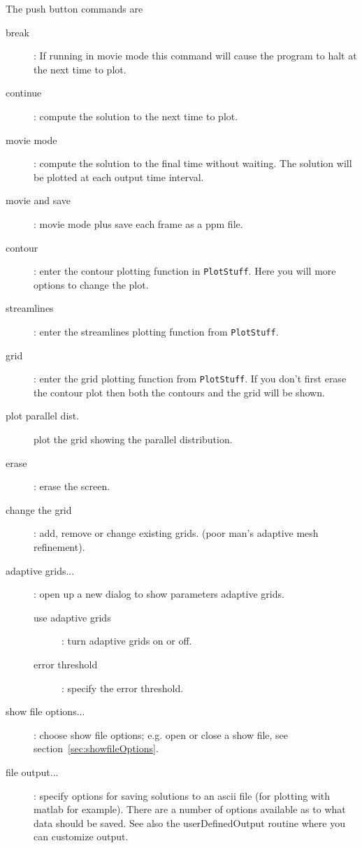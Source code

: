\noindent The push button commands are 
\begin{description}
  \item[\qquad break] : If running in movie mode this command will cause the program to halt at the next
                   time to plot.
  \item[\qquad continue] : compute the solution to the next time to plot.
  \item[\qquad movie mode] : compute the solution to the final time without waiting. The solution will be
       plotted at each output time interval. 
  \item[\qquad movie and save] : movie mode plus save each frame as a ppm file.
  \item[\qquad contour] : enter the contour plotting function in {\tt PlotStuff}. Here you will more options
     to change the plot.  
  \item[\qquad streamlines] : enter the streamlines plotting function from {\tt PlotStuff}.
  \item[\qquad grid] : enter the grid plotting function from {\tt PlotStuff}. If you don't first erase
      the contour plot then both the contours and the grid will be shown.
  \item[\qquad plot parallel dist.] plot the grid showing the parallel distribution. 
  \item[\qquad erase] : erase the screen.
  \item[\qquad change the grid] : add, remove or change existing grids. (poor man's adaptive mesh refinement).
  \item[\qquad adaptive grids...] : open up a new dialog to show parameters adaptive grids.
    \begin{description}
       \item[\qquad use adaptive grids] : turn adaptive grids on or off.
       \item[\qquad error threshold] : specify the error threshold.
    \end{description}
  \item[\qquad show file options...] : choose show file options; e.g. open or close a show file, see section~\ref{sec:showfileOptions}.
  \item[\qquad file output...] : specify options for saving solutions to an ascii file (for plotting with matlab for example).
      There are a number of options available as to what data should be saved. See also the userDefinedOutput routine
      where you can customize output.
    \begin{description}

\end{description}
\end{description}
